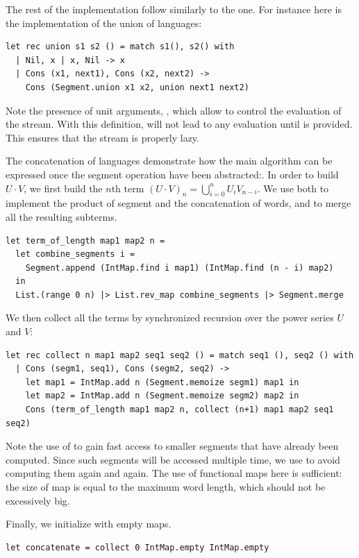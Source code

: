The rest of the implementation follow similarly to the \haskell one. For instance
here is the implementation of the union of languages:
\begin{lstlisting}
let rec union s1 s2 () = match s1(), s2() with
  | Nil, x | x, Nil -> x
  | Cons (x1, next1), Cons (x2, next2) -> 
    Cons (Segment.union x1 x2, union next1 next2)
\end{lstlisting}
Note the presence of unit arguments, \code{()}, which allow to control the
evaluation of the stream. With this definition,  will not lead
to any evaluation until \code{()} is provided. This ensures that the stream is
properly lazy.

The concatenation of languages demonstrate how the main algorithm can
be expressed once the segment operation have been abstracted:.
In order to build $U \cdot V$, we first build the $n$th term
$(U \cdot V)_n = \bigcup_{i=0}^n U_i V_{n-i}$.
We use both  to implement the product
of segment and the concatenation of words, and  to merge
all the resulting subterms.
\begin{lstlisting}
let term_of_length map1 map2 n =
  let combine_segments i =
    Segment.append (IntMap.find i map1) (IntMap.find (n - i) map2)
  in
  List.(range 0 n) |> List.rev_map combine_segments |> Segment.merge
\end{lstlisting}

We then collect all the terms by synchronized recursion over the power series $U$
and $V$:
\begin{lstlisting}
let rec collect n map1 map2 seq1 seq2 () = match seq1 (), seq2 () with
  | Cons (segm1, seq1), Cons (segm2, seq2) ->
    let map1 = IntMap.add n (Segment.memoize segm1) map1 in 
    let map2 = IntMap.add n (Segment.memoize segm2) map2 in
    Cons (term_of_length map1 map2 n, collect (n+1) map1 map2 seq1 seq2)
\end{lstlisting}

Note the use of  to gain fast access to smaller
segments that have already been computed. Since such segments will be accessed
multiple time, we use  to avoid computing them again and again.
The use of functional maps here is sufficient: the size of map is equal
to the maximum word length, which should not be excessively big.

Finally, we initialize  with empty maps.
\begin{lstlisting}[numbers=none]
let concatenate = collect 0 IntMap.empty IntMap.empty
\end{lstlisting}

